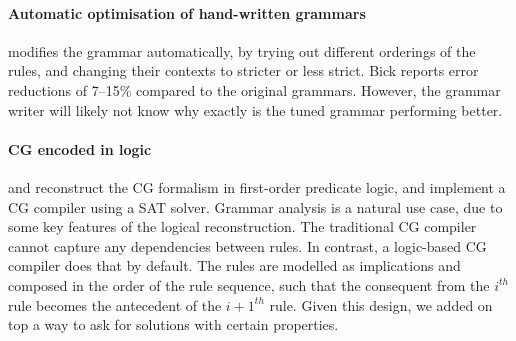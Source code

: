 \paragraph{Automatic optimisation of hand-written grammars }

\cite{bick2013tuning} modifies the grammar automatically, by trying out different orderings of the rules, and changing their contexts to stricter or less strict.
Bick reports error reductions of 7--15\% compared to the original grammars.
However, the grammar writer will likely not know why exactly is the tuned grammar performing better.



\paragraph{CG encoded in logic}

\cite{lager98} and \cite{lager_nivre01} reconstruct the CG formalism in first-order predicate logic, and \cite{listenmaa_claessen2015} implement a CG compiler using a SAT solver.
Grammar analysis is a natural use case, due to some key features of the logical reconstruction.
The traditional CG compiler 
 cannot capture any dependencies between rules.
In contrast, a logic-based CG compiler does that by default. 
The rules are modelled as implications and composed in the order of the rule sequence, such that 
the consequent from the $i^{th}$ rule becomes the antecedent of the $i+1^{th}$ rule.
Given this design, we added on top a way to ask for solutions with certain properties.

